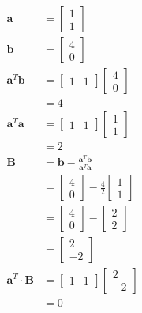 \documentclass[main.tex]{subfiles}
\begin{document}
\begin{enumerate}
    $$
    \begin{aligned}
    \bm{a} &=\left[\begin{array}{l}
    1 \\
    1
    \end{array}\right] \\
    \bm{b} &=\left[\begin{array}{l}
    4 \\
    0
    \end{array}\right] \\
    \bm{a}^{T} \bm{b} &=\left[\begin{array}{ll}
    1 & 1
    \end{array}\right]\left[\begin{array}{l}
    4 \\
    0
    \end{array}\right] \\
    &=4 \\
    \bm{a}^{T} \bm{a} &=\left[\begin{array}{ll}
    1 & 1
    \end{array}\right]\left[\begin{array}{l}
    1 \\
    1
    \end{array}\right] \\
    &=2\\
    \bm{B} &=\bm{b}-\frac{\bm{a}^{T} \bm{b}}{\bm{a}^{T} \bm{a}} \\
    &=\left[\begin{array}{l}
    4 \\
    0
    \end{array}\right]-\frac{4}{2}\left[\begin{array}{l}
    1 \\
    1
    \end{array}\right] \\
    &=\left[\begin{array}{l}
    4 \\
    0
    \end{array}\right]-\left[\begin{array}{l}
    2 \\
    2
    \end{array}\right] \\
    &=\left[\begin{array}{c}
    2 \\
    -2
    \end{array}\right]\\
    \bm{a}^{T} \cdot \bm{B} &=\left[\begin{array}{ll}
    1 & 1
    \end{array}\right]\left[\begin{array}{c}
    2 \\
    -2
    \end{array}\right] \\
    &=0
    \end{aligned}
    $$
    

\end{enumerate}
\end{document}
